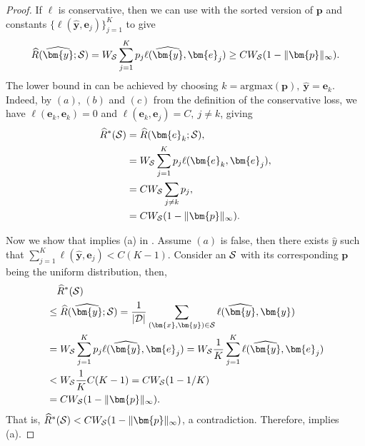 \documentclass[letterpaper]{article} %
\newcommand{\bx}{{\bm{x}}}
\newcommand{\bp}{{\bm{p}}}
\newcommand{\by}{{\bm{y}}}
\newcommand{\be}{{\bm{e}}}
\newcommand{\cS}{{\cal{S}}}
\newcommand{\cD}{{\cal{D}}}
\newcommand{\WS}{{W_{\cal{S}}}}
\newcommand{\simplex}{\Delta}
\newcommand{\argmax}{\mathrm{argmax}}
\begin{document}
\universal*
\begin{proof}
    If $\ell$ is conservative, then we can use  with the sorted version of $\bp$ and constants $\{\ell(\widehat{\by},\be_j)\}_{j=1}^K$ to give
    \begin{align}
        \widehat{R}(\widehat{\by};\cS) = \WS\sum_{j=1}^K p_j\ell(\widehat{\by},\be_j) \geq C\WS (1-\|\bp\|_\infty).\label{eq:lb}
    \end{align}
    The lower bound in  can be achieved by choosing $k=\argmax(\bp),\ \widehat{\by}=\be_k$. 
    Indeed, by $(a)$, $(b)$ and $(c)$ from the definition of the conservative loss, we have $\ell(\be_k,\be_k)=0$ and $\ell(\be_k,\be_j)=C,\ j\ne k$, giving 
    \begin{align*}
        \widehat{R}^*(\cS)
        &= \widehat{R}(\be_{k};\cS),
        \\
        &=\WS\sum_{j=1}^K p_j\ell(\be_k,\be_j),
        \\
        &=C\WS\sum_{j\ne k} p_j,
        \\
        &=C\WS (1-\|\bp\|_\infty).
    \end{align*}
    
    Now we show that  implies (a) in .
    Assume $(a)$ is false, then there exists $\widehat{y}$ such that
    $\sum_{j=1}^K\ell(\widehat{\by},\be_j) < C(K-1)$. 
    Consider an $\cS$ with its corresponding $\bp$ being the uniform distribution, then, 
    \begin{align*}
        &\quad \widehat{R}^{*}(\cS) \\
        &\le \widehat{R}(\widehat{\by};\cS) 
            = \frac{1}{|\cD|}\sum_{(\bx,\by)\in\cS} \ell(\widehat{\by},\by)\\
        &= \WS \sum_{j=1}^K p_j\ell(\widehat{\by},\be_j)
            = \WS\frac{1}{K}\sum_{j=1}^K \ell(\widehat{\by},\be_j) \\
        &< \WS\frac{1}{K}C(K-1)
            =  C\WS (1-1/K) \\
        &= C \WS (1-\|\bp\|_\infty).
    \end{align*}
    That is, $\widehat{R}^{*}(\cS) < C \WS (1-\|\bp\|_\infty)$, a contradiction.
    Therefore,  implies (a).
\end{proof}
\end{document}
